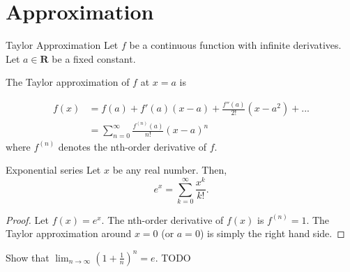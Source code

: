 \section{Approximation}
\begin{fact}{Taylor Approximation}{}
  Let $f$ be a continuous function with infinite derivatives.
  Let $a\in \textbf{R}$ be a fixed constant.

  The Taylor approximation of $f$ at $x=a$ is

  \begin{align}
    f(x) &= f(a) + f'(a)(x-a) + \frac{f''(a)}{2!}(x-a^2)+...\\
         &= \sum^{\infty}_{n=0}\frac{f^{(n)}(a)}{n!}(x-a)^n
  \end{align}
  where $f^{(n)}$ denotes the nth-order derivative of $f$.
\end{fact}


\begin{fact}{Exponential series}{}
  Let $x$ be any real number. Then,
  \[
    e^x = \sum_{k=0}^{\infty}\frac{x^k}{k!}.
  \]
  \tcblower
  \begin{proof}
    Let $f(x) = e^x$.
    The nth-order derivative of $f(x)$ is $f^{(n)}=1$.
    The Taylor approximation around $x=0$ (or $a=0$) is simply the right hand side.
  \end{proof}
\end{fact}

\begin{exec}{}{}
   Show that $\lim_{n\rightarrow\infty}(1+\frac{1}{n})^n=e$.
   \tcblower
   TODO
\end{exec}
